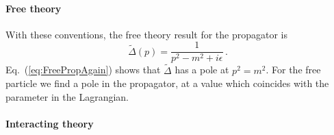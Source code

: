 \documentclass[notes]{subfiles}
\begin{document}
\paragraph{Free theory}

With these conventions, the free theory result for the propagator is
\begin{equation}
  \label{eq:FreePropAgain}
  \tilde\Delta(p) = \frac{1}{p^2-m^2+i\epsilon}\, .
\end{equation}
Eq.~(\ref{eq:FreePropAgain}) shows that $\tilde{\Delta}$ has a pole at
$p^2=m^2$. For the free particle we find a pole in the propagator,
at a value which coincides with the parameter in the Lagrangian.

\paragraph{Interacting theory}
\end{document}
